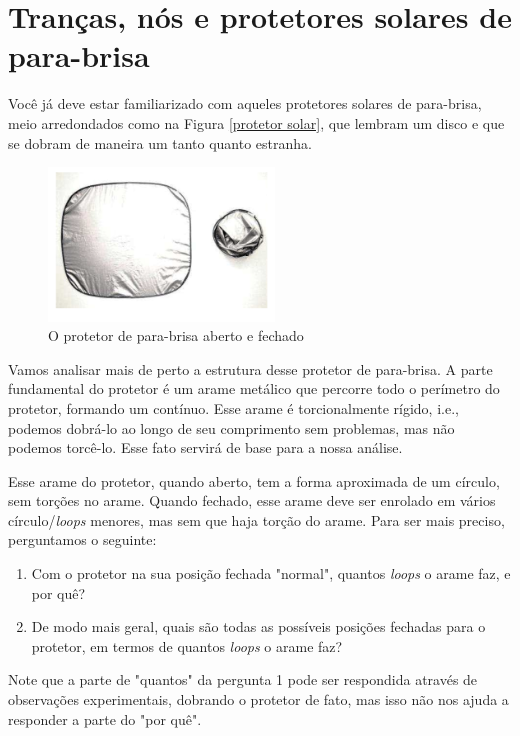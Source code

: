\documentclass[a4paper,portuguese,11pt,twoside, leqno]{book}
\theoremstyle{definition}
\begin{document}
	\section{Tranças, nós e protetores solares de para-brisa}
	\hspace{12pt} Você já deve estar familiarizado com aqueles protetores solares de para-brisa, meio arredondados como na Figura \eqref{protetor solar}, que lembram um disco e que se dobram de maneira um tanto quanto estranha.
	
	\begin{figure}[H]
		\begin{center}
			\includegraphics[width=6cm]{Images/protetor_solar.png}
		\end{center}\caption{O protetor de para-brisa aberto e fechado}\label{protetor solar}
	\end{figure}
	\par\vspace{0.3cm} Vamos analisar mais de perto a estrutura desse protetor de para-brisa. A parte fundamental do protetor é um arame metálico que percorre todo o perímetro do protetor, formando um  contínuo. Esse arame é torcionalmente rígido, i.e., podemos dobrá-lo ao longo de seu comprimento sem problemas, mas não podemos torcê-lo. Esse fato servirá de base para a nossa análise.
	\par\vspace{0.3cm} Esse arame do protetor, quando aberto, tem a forma aproximada de um círculo, sem torções no arame. Quando fechado, esse arame deve ser enrolado em vários círculo/\textit{loops} menores, mas sem que haja torção do arame. Para ser mais preciso, perguntamos o seguinte:
	\begin{enumerate}
		\item Com o protetor na sua posição fechada "normal", quantos \textit{loops} o arame faz, e por quê?
		\item De modo mais geral, quais são todas as possíveis posições fechadas para o protetor, em termos de quantos \textit{loops} o arame faz? 
	\end{enumerate} 
	\par\vspace{0.3cm} Note que a parte de "quantos" da pergunta 1 pode ser respondida através de observações experimentais, dobrando o protetor de fato, mas isso não nos ajuda a responder a parte do "por quê".
\end{document}
